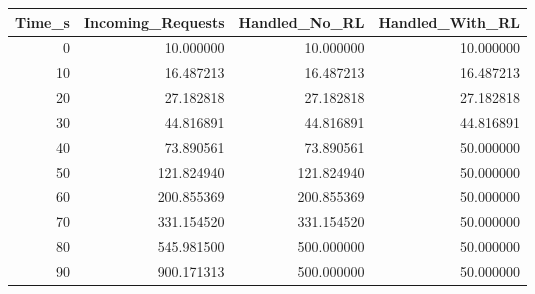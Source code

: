 \begin{tabular}{rrrr}
\toprule
Time_s & Incoming_Requests & Handled_No_RL & Handled_With_RL \\
\midrule
0 & 10.000000 & 10.000000 & 10.000000 \\
10 & 16.487213 & 16.487213 & 16.487213 \\
20 & 27.182818 & 27.182818 & 27.182818 \\
30 & 44.816891 & 44.816891 & 44.816891 \\
40 & 73.890561 & 73.890561 & 50.000000 \\
50 & 121.824940 & 121.824940 & 50.000000 \\
60 & 200.855369 & 200.855369 & 50.000000 \\
70 & 331.154520 & 331.154520 & 50.000000 \\
80 & 545.981500 & 500.000000 & 50.000000 \\
90 & 900.171313 & 500.000000 & 50.000000 \\
\bottomrule
\end{tabular}
